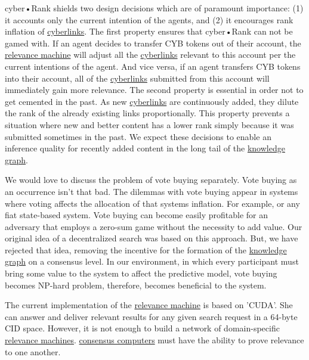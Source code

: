 \documentclass[8pt,oneside]{amsart}
\newcommand{\linkgreen}[2]{\href{#1}{\color{green}{#2}}}
\begin{document}
cyber•Rank shields two design decisions which are of paramount importance: (1) it accounts only the current intention of the agents, and (2) it encourages rank inflation of {\hyperref[cyberlinks]{cyberlinks}}. The first property ensures that cyber•Rank can not be gamed with. If an agent decides to transfer CYB tokens out of their account, the {\hyperref[relevance-machine]{relevance machine}} will adjust all the {\hyperref[cyberlinks]{cyberlinks}} relevant to this account per the current intentions of the agent. And vice versa, if an agent transfers CYB tokens into their account, all of the {\hyperref[cyberlinks]{cyberlinks}} submitted from this account will immediately gain more relevance. The second property is essential in order not to get cemented in the past. As new {\hyperref[cyberlinks]{cyberlinks}} are continuously added, they dilute the rank of the already existing links proportionally. This property prevents a situation where new and better content has a lower rank simply because it was submitted sometimes in the past. We expect these decisions to enable an inference quality for recently added content in the long tail of the {\hyperref[knowledge-graph]{knowledge graph}}.

We would love to discuss the problem of vote buying separately. Vote buying as an occurrence isn't that bad. The dilemmas with vote buying appear in systems where voting affects the allocation of that systems inflation. For example, \linkgreen{http://ipfs.io/ipfs/QmepU77tqMAHHuiSASUvUnu8f8ENuPF2Kfs97WjLn8vAS3}{Steem}
or any fiat state-based system. Vote buying can become easily profitable for an adversary that employs a zero-sum game without the necessity to add value. Our original idea of a decentralized search was based on this approach. But, we have rejected that idea, removing the incentive for the formation of the {\hyperref[knowledge-graph]{knowledge graph}} on a consensus level. In our environment, in which every participant must bring some value to the system to affect the predictive model, vote buying becomes NP-hard problem, therefore, becomes beneficial to the system.

The current implementation of the {\hyperref[relevance-machine]{relevance machine}} is based on 'CUDA'. She can answer and deliver relevant results for any given search request in a 64-byte CID space. However, it is not enough to build a network of domain-specific {\hyperref[relevance-machine]{relevance machines}}. {\hyperref[consensus-computer]{consensus computers}} must have the ability to prove relevance to one another.
\end{document}
